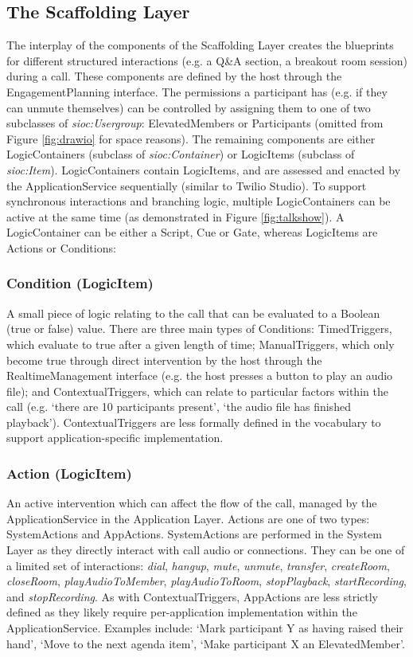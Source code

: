 \subsection{The Scaffolding Layer}
The interplay of the components of the Scaffolding Layer creates the blueprints for different structured interactions (e.g. a Q\&A section, a breakout room session) during a call. These components are defined by the host through the EngagementPlanning interface. The permissions a participant has (e.g. if they can unmute themselves) can be controlled by assigning them to one of two subclasses of \textit{sioc:Usergroup}: ElevatedMembers or Participants (omitted from Figure \ref{fig:drawio} for space reasons). The remaining components are either LogicContainers (subclass of \textit{sioc:Container}) or LogicItems (subclass of \textit{sioc:Item}). LogicContainers contain LogicItems, and are assessed and enacted by the ApplicationService sequentially (similar to Twilio Studio). To support synchronous interactions and branching logic, multiple LogicContainers can be active at the same time (as demonstrated in Figure \ref{fig:talkshow}). A LogicContainer can be either a Script, Cue or Gate, whereas LogicItems are Actions or Conditions: 

\subsubsection{Condition (LogicItem)}

A small piece of logic relating to the call that can be evaluated to a Boolean (true or false) value. There are three main types of Conditions: TimedTriggers, which evaluate to true after a given length of time; ManualTriggers, which only become true through direct intervention by the host through the RealtimeManagement interface (e.g. the host presses a button to play an audio file); and ContextualTriggers, which can relate to particular factors within the call (e.g. `there are 10 participants present', `the audio file has finished playback'). ContextualTriggers are less formally defined in the vocabulary to support application-specific implementation.

\subsubsection{Action (LogicItem)}

An active intervention which can affect the flow of the call, managed by the ApplicationService in the Application Layer. Actions are one of two types: SystemActions and AppActions. SystemActions are performed in the System Layer as they directly interact with call audio or connections. They can be one of a limited set of interactions: \textit{dial}, \textit{hangup}, \textit{mute}, \textit{unmute}, \textit{transfer}, \textit{createRoom}, \textit{closeRoom}, \textit{playAudioToMember}, \textit{playAudioToRoom}, \textit{stopPlayback}, \textit{startRecording}, and \textit{stopRecording}. As with ContextualTriggers, AppActions are less strictly defined as they likely require per-application implementation within the ApplicationService. Examples include: `Mark participant Y as having raised their hand', `Move to the next agenda item', `Make participant X an ElevatedMember'.

